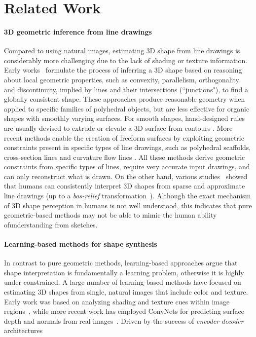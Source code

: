 \documentclass[10pt, conference, compsocconf]{IEEEtran}
\begin{document}
\section{Related Work}
\label{sec:related_work}
\vspace{-2mm}\paragraph{3D geometric inference from line drawings} 
Compared to using natural images, estimating 3D shape from line drawings is considerably more challenging due to the lack of shading or texture information. 
Early works~\cite{waltz1975understanding,malik1987interpreting,Lipson96,Zeleznik:1996:SIS} formulate the process of inferring a 3D shape based on reasoning about local geometric properties, such as convexity, parallelism, orthogonality and discontinuity, implied by lines and their intersections (``junctions"), to find a globally consistent shape. 
These approaches produce reasonable geometry when applied to specific families of polyhedral objects, but are less effective for organic shapes with smoothly varying surfaces. For smooth shapes, hand-designed rules  are usually devised to extrude or elevate a 3D surface from contours \cite{Igarashi:1999:TSI,Olsen}. More recent methods enable the creation of freeform surfaces by exploiting geometric constraints present in specific types of line drawings, such as polyhedral scaffolds, cross-section lines and curvature flow lines \cite{Schmidt:2009:ADS,Xu:2014:True2Form,Pan:2015:FAS}. All these methods derive geometric constraints from specific types of lines,  require very accurate input drawings, and  can only reconstruct what is drawn. On the other hand, various studies~\cite{koenderink1992surface,cole2009well} showed that humans can consistently interpret  3D shapes  from sparse and approximate line drawings (up to a \emph{bas-relief} transformation~\cite{belhumeur1999bas}). Although the exact mechanism of 3D shape perception in humans is not well understood, this indicates that pure geometric-based methods may not be able to  mimic the human ability of\shape understanding from sketches.
\vspace{-2mm}\paragraph{Learning-based methods for shape synthesis}
In contrast to pure geometric methods, learning-based approaches argue that shape interpretation is  fundamentally a learning problem, otherwise it is highly under-constrained. A large number of learning-based methods have focused on estimating 3D shapes from single, natural images that include color and texture. Early work was based on analyzing shading and texture cues within image regions~\cite{hoiem2005geometric,saxena2009make3d}, while more recent work has employed ConvNets for predicting surface depth and normals from real images~\cite{eigen2015predicting,wang2015designing}. Driven by the success of  \emph{encoder-decoder} architectures~\cite{larsson2016learning,zhang2016colorful, johnson2016perceptual,ulyanov2016texture,pix2pix2016}
\end{document}
